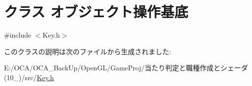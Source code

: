 \hypertarget{class_xE3_x82_xAA_xE3_x83_x96_xE3_x82_xB8_xE3_x82_xA7_xE3_x82_xAF_xE3_x83_x88_xE6_x93_x8D_xE4_xBD_x9C_xE5_x9F_xBA_xE5_xBA_x95}{\section{クラス オブジェクト操作基底}
\label{class_xE3_x82_xAA_xE3_x83_x96_xE3_x82_xB8_xE3_x82_xA7_xE3_x82_xAF_xE3_x83_x88_xE6_x93_x8D_xE4_xBD_x9C_xE5_x9F_xBA_xE5_xBA_x95}
}


{\ttfamily \#include $<$Key.\-h$>$}



このクラスの説明は次のファイルから生成されました\-:\begin{DoxyCompactItemize}
\item 
E\-:/\-O\-C\-A/\-O\-C\-A\-\_\-\-Back\-Up/\-Open\-G\-L/\-Game\-Proj/当たり判定と職種作成とシェーダ(10\-\_)/src/\hyperlink{_key_8h}{Key.\-h}\end{DoxyCompactItemize}
